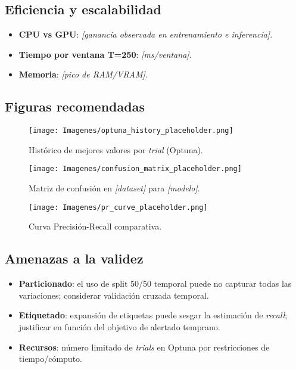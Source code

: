 \subsection{Eficiencia y escalabilidad}
\begin{itemize}
    \item \textbf{CPU vs GPU}: \textit{[ganancia observada en entrenamiento e inferencia]}.
    \item \textbf{Tiempo por ventana T=250}: \textit{[ms/ventana]}.
    \item \textbf{Memoria}: \textit{[pico de RAM/VRAM]}.
\end{itemize}

\subsection{Figuras recomendadas}
\begin{figure}[htbp]
    \centering
    \texttt{[image: Imagenes/optuna\_history\_placeholder.png]}
    \caption{Histórico de mejores valores por \textit{trial} (Optuna).}
    \label{fig:optuna-history}
\end{figure}

\begin{figure}[htbp]
    \centering
    \texttt{[image: Imagenes/confusion\_matrix\_placeholder.png]}
    \caption{Matriz de confusión en \textit{[dataset]} para \textit{[modelo]}.}
    \label{fig:confusion-matrix}
\end{figure}

\begin{figure}[htbp]
    \centering
    \texttt{[image: Imagenes/pr\_curve\_placeholder.png]}
    \caption{Curva Precisión-Recall comparativa.}
    \label{fig:pr-curve}
\end{figure}

\subsection{Amenazas a la validez}
\begin{itemize}
    \item \textbf{Particionado}: el uso de split 50/50 temporal puede no capturar todas las variaciones; considerar validación cruzada temporal.
    \item \textbf{Etiquetado}: expansión de etiquetas puede sesgar la estimación de \textit{recall}; justificar en función del objetivo de alertado temprano.
    \item \textbf{Recursos}: número limitado de \textit{trials} en Optuna por restricciones de tiempo/cómputo.
\end{itemize}

